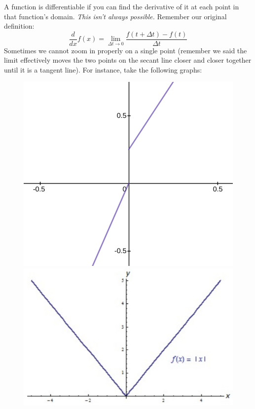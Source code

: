 A function is differentiable if you can find the derivative of it at each point in that function's domain. \textit{This isn't always possible.} Remember our original definition:
\begin{equation*}
    \frac{d}{dx}f(x) = \lim_{\Delta t\rightarrow 0} \frac{f(t+\Delta t) - f(t)}{\Delta t}
\end{equation*}
Sometimes we cannot zoom in properly on a single point (remember we said the limit effectively moves the two points on the secant line closer and closer together until it is a tangent line). For instance, take the following graphs:
\begin{figure}[H]
    \centering
    \includegraphics[scale=.1]{split.png}
    \includegraphics[scale=.15]{corner.png}

\end{figure}
